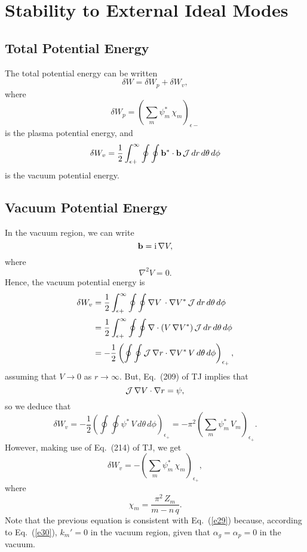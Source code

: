 \documentclass[12pt,prb,aps,notitlepage]{revtex4-1}
\begin{document}
\section{Stability to External Ideal Modes}
\subsection{Total Potential Energy}
The total potential energy can be written
\begin{equation}\label{e79}
\delta W= \delta W_p + \delta W_v,
\end{equation}
where
\begin{equation}\label{e80}
\delta W_p= \left(\sum_m\psi_m^\ast\,\chi_m\right)_{\epsilon-}
\end{equation}
is the plasma potential energy, 
and
\begin{equation}
\delta W_v = \frac{1}{2}\int_{\epsilon+}^\infty\oint\oint {\bf b}^\ast\cdot{\bf b} \,{\cal J}\,dr\,d\theta\,d\phi
\end{equation}
is the vacuum potential energy.

\subsection{Vacuum Potential Energy}
In the vacuum region, we can write
\begin{equation}
{\bf b} = {\rm i}\,\nabla V,
\end{equation}
where
\begin{equation}
\nabla^2 V =0.
\end{equation}
Hence, the vacuum potential energy is
\begin{align}
\delta W_v &= \frac{1}{2}\int_{\epsilon+}^\infty\oint\oint\nabla V\,\cdot\nabla V^\ast\,{\cal J}\,dr\,d\theta\,d\phi\nonumber\\[0.5ex]
&= \frac{1}{2}\int_{\epsilon+}^\infty\oint\oint  \nabla\cdot(V\,\nabla V^\ast)\,{\cal J}\,dr\,d\theta\,d\phi\nonumber\\[0.5ex]
&=-\frac{1}{2}\left(\oint\oint {\cal J}\,\nabla r\cdot\nabla V^\ast\,V\,d\theta\,d\phi\right)_{\epsilon_+},
\end{align}
assuming that $V\rightarrow 0$ as $r\rightarrow \infty$. 
But, Eq.~(209) of TJ implies that 
\begin{equation}
{\cal J}\,\nabla V\cdot\nabla r = \psi,
\end{equation}
so we deduce that
\begin{equation}\label{e87}
\delta W_v = -\frac{1}{2}\left(\oint\oint \psi^\ast\,V\,d\theta\,d\phi\right)_{\epsilon_{+}} =- \pi^2\left(\sum_m \psi_m^\ast\,V_m\right)_{\epsilon_{+}}.
\end{equation}
However, making use of Eq.~(214) of TJ, we get
\begin{equation}\label{e88}
\delta W_v =-\left(\sum_m\psi_m^\ast\,\chi_m\right)_{\epsilon_+},
\end{equation}
where
\begin{equation}\label{e89}
\chi_m=\frac{\pi^2\,Z_m}{m-n\,q}.
 \end{equation}
 Note that the previous equation is consistent with Eq.~(\ref{e29}) because, according to Eq.~(\ref{e30}),  $k_m'=0$ in the vacuum region, given that $\alpha_g=\alpha_p=0$ in the vacuum. 
\end{document}
